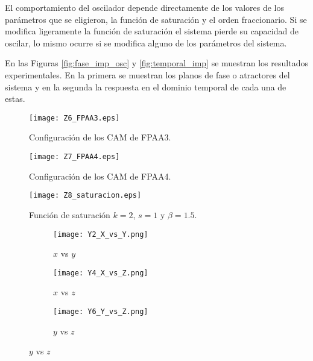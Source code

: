 	El comportamiento del oscilador depende directamente de los valores de los parámetros que se eligieron, la función de saturación y el orden fraccionario. Si se modifica ligeramente la función de saturación el sistema pierde su capacidad de oscilar, lo mismo ocurre si se modifica alguno de los parámetros del sistema. 
	
	En las Figuras \ref{fig:fase_imp_osc} y \ref{fig:temporal_imp} se muestran los resultados experimentales. En la primera se muestran los planos de fase o atractores  del sistema y en la segunda la respuesta en el dominio temporal de cada una de estas.
	\begin{figure}[!ht] 
		\caption{Configuración de los CAM de FPAA3.}
		\label{fig:Z6_FPAA3}
		\centering
		\texttt{[image: Z6\_FPAA3.eps]}
	\end{figure}
	
	\begin{figure}[!ht] 
		\caption{Configuración de los CAM de FPAA4.}
		\label{fig:Z7_FPAA4}
		\centering
		\texttt{[image: Z7\_FPAA4.eps]}
	\end{figure}
	
	\begin{figure}[!ht]
		\caption{Función de saturación $k = 2$, $s = 1$ y $\beta= 1.5$.} 
		\label{fig:Z8_saturacion}
		\centering
		\texttt{[image: Z8\_saturacion.eps]}
	\end{figure}

	
	\begin{figure}[!ht]
	\caption{Vistas de plano fase del comportamiento del oscilador caótico con $\alpha = 0.8$ y dos enrollamientos.}
	\label{fig:fase_imp_osc}
	  \begin{subfigure}[b]{0.3\textwidth}
	    \texttt{[image: Y2\_X\_vs\_Y.png]}
	    \caption{$x$ vs $y$}
	    \label{Y2_X_vs_Y}
	  \end{subfigure}
	  \hfill
	  \begin{subfigure}[b]{0.3\textwidth}
	    \texttt{[image: Y4\_X\_vs\_Z.png]}
	    \caption{$x$ vs $z$}
	    \label{fig:Y4_X_vs_Z}
	  \end{subfigure}
	  \hfill
	  \begin{subfigure}[b]{0.3\textwidth}
	    \texttt{[image: Y6\_Y\_vs\_Z.png]}
	    \caption{$y$ vs $z$}
	    \label{Y6_Y_vs_Z}
	  \end{subfigure}
	\end{figure}
	
